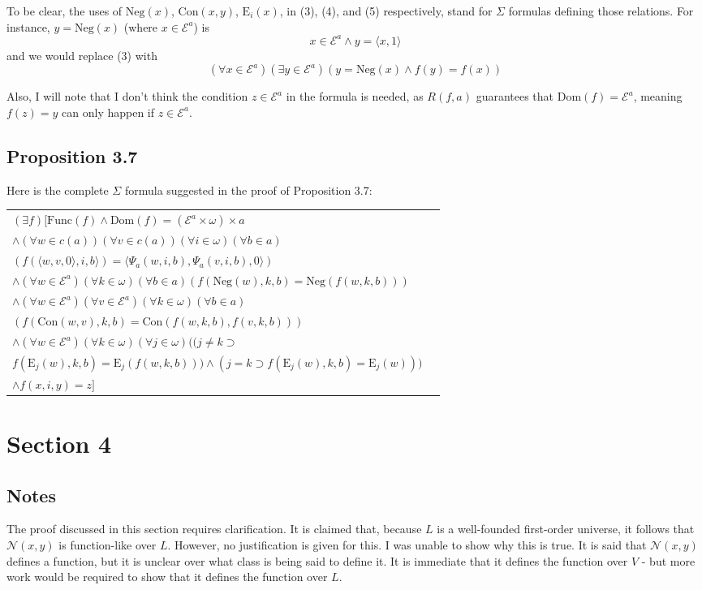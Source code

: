 \documentclass{article}
\theoremstyle{definition}
\begin{document}
To be clear, the uses of $\textrm{Neg}(x)$, $\textrm{Con}(x,y)$, $\textrm{E}_i(x)$, in (3), (4), and (5) respectively, stand for 
$\Sigma$ formulas defining those relations. For instance, $y=\textrm{Neg}(x)$ (where $x\in\mathcal{E}^a$) is
\[ x\in\mathcal{E}^a\wedge y=\langle x,1\rangle \]
and we would replace (3) with
\[ (\forall x\in\mathcal{E}^a)(\exists y\in\mathcal{E}^a)(y=\textrm{Neg}(x)\wedge f(y)=f(x)) \]

Also, I will note that I don't think the condition $z\in\mathcal{E}^a$ in the formula is needed, as $R(f,a)$ guarantees that 
$\textrm{Dom}(f)=\mathcal{E}^a$, meaning $f(z)=y$ can only happen if $z\in\mathcal{E}^a$.

\subsection*{Proposition 3.7}
Here is the complete $\Sigma$ formula suggested in the proof of Proposition 3.7:
\begin{center}
\begin{tabular}{ll}
$(\exists f)[\textrm{Func}(f)\wedge\textrm{Dom}(f)=(\mathcal{E}^a\times\omega)\times a$ \\
$\wedge(\forall w\in c(a))(\forall v\in c(a))(\forall i\in\omega)(\forall b\in a)$ \\
$(f(\langle w,v,0\rangle,i,b\rangle)=\langle\Psi_a(w,i,b),\Psi_a(v,i,b),0\rangle)$ \\
$\wedge(\forall w\in\mathcal{E}^a)(\forall k\in\omega)(\forall b\in a)(f(\textrm{Neg}(w),k,b)=\textrm{Neg}(f(w,k,b)))$ \\
$\wedge(\forall w\in\mathcal{E}^a)(\forall v\in\mathcal{E}^a)(\forall k\in\omega)(\forall b\in a)$ \\
$(f(\textrm{Con}(w,v),k,b)=\textrm{Con}(f(w,k,b),f(v,k,b)))$ \\
$\wedge(\forall w\in\mathcal{E}^a)(\forall k\in\omega)(\forall j\in\omega)((j\ne k\supset$ \\
$f(\textrm{E}_j(w),k,b)=\textrm{E}_j(f(w,k,b)))\wedge(j=k\supset f(\textrm{E}_j(w),k,b)=\textrm{E}_j(w)))$ \\
$\wedge f(x,i,y)=z]$
\end{tabular}
\end{center}

\section*{Section 4}

\subsection*{Notes}
The proof discussed in this section requires clarification. It is claimed that, because $L$ is a well-founded first-order universe, 
it follows that $\mathcal{N}(x,y)$ is function-like over $L$. However, no justification is given for this. I was unable to 
show why this is true. It is said that $\mathcal{N}(x,y)$ defines a function, but it is unclear over what class is being said to define it. 
It is immediate 
that it defines the function over $V$ - but more work would be required to show that it defines the function over $L$.
\end{document}
